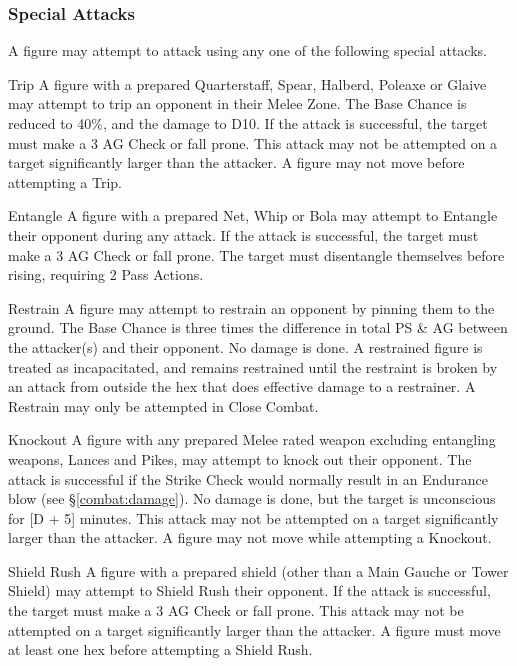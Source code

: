 \begin{multicols*}{3}
\subsubsection{Special Attacks}

A figure may attempt to attack using any one of the following special
attacks.

\begin{Description}

\item[Trip] A figure with a prepared Quarterstaff, Spear, Halberd,
Poleaxe or Glaive may attempt to trip an opponent in their Melee
Zone. The Base Chance is reduced to 40\%, and the damage to D10. If
the attack is successful, the target must make a 3 \x AG Check or fall
prone. This attack may not be attempted on a target significantly
larger than the attacker. A figure may not move before attempting a
Trip.

\item[Entangle] A figure with a prepared Net, Whip or Bola may attempt
to Entangle their opponent during any attack. If the attack is
successful, the target must make a 3 \x AG Check or fall prone. The
target must disentangle themselves before rising, requiring 2 Pass
Actions.

\item[Restrain] A figure may attempt to restrain an opponent by
pinning them to the ground. The Base Chance is three times the
difference in total PS \& AG between the attacker(s) and their
opponent. No damage is done. A restrained figure is treated as
incapacitated, and remains restrained until the restraint is broken by
an attack from outside the hex that does effective damage to a
restrainer. A Restrain may only be attempted in Close Combat.

\item[Knockout] A figure with any prepared Melee rated weapon
excluding entangling weapons, Lances and Pikes, may attempt to knock
out their opponent. The attack is successful if the Strike Check would
normally result in an Endurance blow (see \S \ref{combat:damage}). No
damage is done, but the target is unconscious for [D + 5] minutes.
This attack may not be attempted on a target significantly larger than
the attacker. A figure may not move while attempting a Knockout.

\item[Shield Rush] A figure with a prepared shield (other than a Main
Gauche or Tower Shield) may attempt to Shield Rush their opponent. If
the attack is successful, the target must make a 3 \x AG Check or fall
prone. This attack may not be attempted on a target significantly
larger than the attacker. A figure must move at least one hex before
attempting a Shield Rush.


\end{Description}
\end{multicols*}
